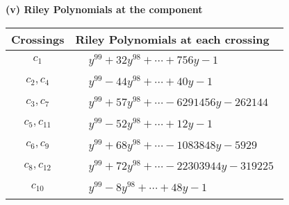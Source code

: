 \documentclass[1p]{elsarticle_modified}
\theoremstyle{definition}
\begin{document}
\newpage\renewcommand{\arraystretch}{1}
\flushleft \textbf{(v) Riley Polynomials at the component}\newline \\
\begin{tabular}{m{50pt}|m{274pt}}
Crossings & \hspace{64pt}Riley Polynomials at each crossing \\
\hline $$\begin{aligned}c_{1}\end{aligned}$$&$\begin{aligned}
&y^{99}+32 y^{98}+\cdots+756 y-1
\end{aligned}$\\
\hline $$\begin{aligned}c_{2},c_{4}\end{aligned}$$&$\begin{aligned}
&y^{99}-44 y^{98}+\cdots+40 y-1
\end{aligned}$\\
\hline $$\begin{aligned}c_{3},c_{7}\end{aligned}$$&$\begin{aligned}
&y^{99}+57 y^{98}+\cdots-6291456 y-262144
\end{aligned}$\\
\hline $$\begin{aligned}c_{5},c_{11}\end{aligned}$$&$\begin{aligned}
&y^{99}-52 y^{98}+\cdots+12 y-1
\end{aligned}$\\
\hline $$\begin{aligned}c_{6},c_{9}\end{aligned}$$&$\begin{aligned}
&y^{99}+68 y^{98}+\cdots-1083848 y-5929
\end{aligned}$\\
\hline $$\begin{aligned}c_{8},c_{12}\end{aligned}$$&$\begin{aligned}
&y^{99}+72 y^{98}+\cdots-22303944 y-319225
\end{aligned}$\\
\hline $$\begin{aligned}c_{10}\end{aligned}$$&$\begin{aligned}
&y^{99}-8 y^{98}+\cdots+48 y-1
\end{aligned}$\\
\hline
\end{tabular}\\~\\
\end{document}
